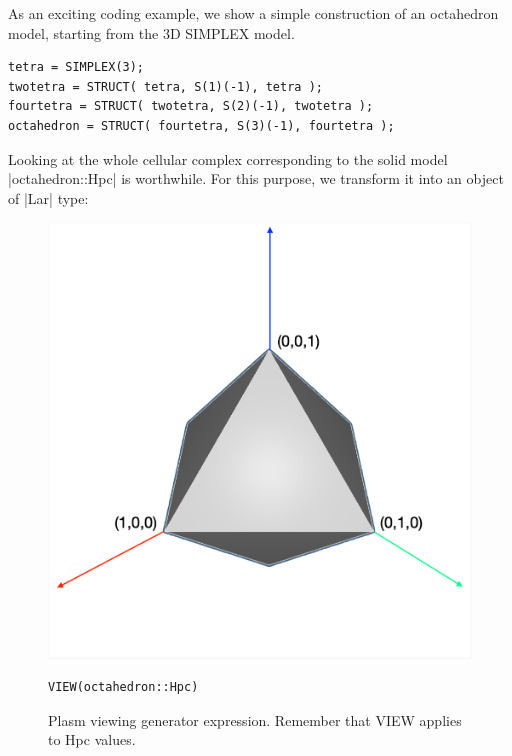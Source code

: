 \begin{coding}
As an exciting coding example, we show a simple construction of an octahedron model, starting from the 3D SIMPLEX model.
\begin{lstlisting}[language=JuliaLocal, style=julia, mathescape=true]
tetra = SIMPLEX(3);
twotetra = STRUCT( tetra, S(1)(-1), tetra );
fourtetra = STRUCT( twotetra, S(2)(-1), twotetra );
octahedron = STRUCT( fourtetra, S(3)(-1), fourtetra );
\end{lstlisting}

Looking at the whole cellular complex corresponding to the solid model |octahedron::Hpc| is worthwhile. For this purpose, we transform it into an object of |Lar| type:

\begin{figure}[htbp] %
\begin{minipage}[c]{0.35\textwidth}
   \includegraphics[width=\linewidth]{chapter-04/figs/octahedron} 
\end{minipage} \hfill
\begin{minipage}[c]{0.6\textwidth}
\begin{lstlisting}[language=JuliaLocal, style=julia, mathescape=true]
VIEW(octahedron::Hpc)
\end{lstlisting}
\caption{Plasm viewing generator expression. Remember that VIEW applies to Hpc values.}\label{fig:octahedron}
\end{minipage}
\end{figure}


\end{coding}
